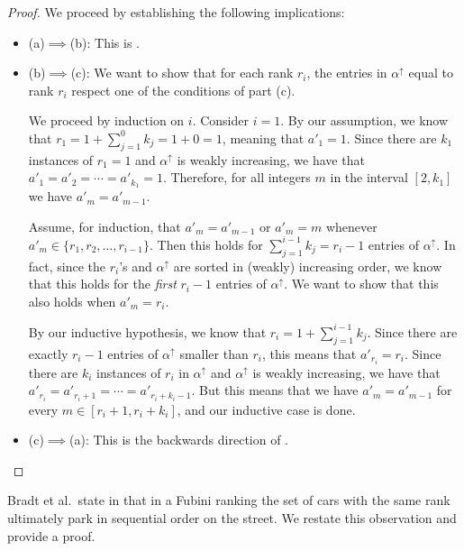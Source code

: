 \documentclass{amsart}
\theoremstyle{definition}
\theoremstyle{definition}
\theoremstyle{remark}
\begin{document}
\begin{proof}
We proceed by establishing the following implications:
    \begin{itemize}[leftmargin=.15in]
        \item (a)$\implies$(b): This is . 
    
        \item (b)$\implies$(c): We want to show that for each rank $r_i$, the entries in $\alpha^{\uparrow}$ equal to rank $r_i$ respect one of the conditions of part (c). 

        We proceed by induction on $i$. Consider $i=1$. By our assumption, we know that $r_1 = 1 + \sum_{j=1}^{0} k_j = 1+0 = 1$, meaning that $a'_1 = 1$. Since there are $k_1$ instances of $r_1 = 1$ and $\alpha^{\uparrow}$ is weakly increasing, we have that $a'_1 = a'_2 = \cdots = a'_{k_1} = 1$. Therefore, for all integers $m$ in the interval $[2, k_1]$ we have $a'_m = a'_{m-1}$.  

        Assume, for induction, that $a'_m = a'_{m-1}$ or $a'_m = m$ whenever $a'_m \in \{r_1, r_2, \ldots, r_{i-1}\}$. Then this holds for $\sum_{j=1}^{i-1} k_j = r_i-1$ entries of $\alpha^{\uparrow}$.  In fact, since the $r_i$'s and $\alpha^{\uparrow}$ are sorted in (weakly) increasing order, we know that this holds for the \emph{first} $r_i-1$ entries of $\alpha^{\uparrow}$. We want to show that this also holds when $a'_m = r_i$. 
        
        By our inductive hypothesis, we know that $r_i = 1 + \sum_{j=1}^{i-1} k_j$. Since there are exactly $r_i-1$ entries of $\alpha^{\uparrow}$ smaller than $r_i$, this means that $a'_{r_i} = r_i$. Since there are $k_i$ instances of $r_i$ in $\alpha^{\uparrow}$ and $\alpha^{\uparrow}$ is weakly increasing, we have that $a'_{r_i} = a'_{r_i+1} = \cdots = a'_{r_i+k_i-1}$. 
        But this means that we have $a'_m = a'_{m-1}$ for every $m \in [r_i+1, r_i + k_i]$, and our inductive case is done.
    
        \item (c)$\implies$(a): This is the backwards direction of .\qedhere
    
    \end{itemize}
\end{proof}

Bradt et al.\ state  in \cite[Observation 2.4]{rFubini} that in a Fubini ranking the set of cars with the same rank ultimately park in sequential order on the street. 
We restate this observation and provide a proof.
\end{document}

